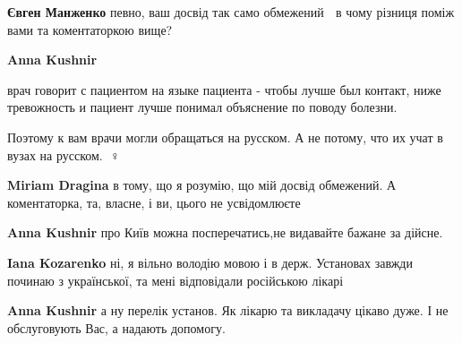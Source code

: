\begin{itemize}
\begin{itemize}
\textbf{Євген Манженко} певно, ваш досвід так само обмежений 🤭 в чому різниця поміж вами та коментаторкою вище?

 
\textbf{Anna Kushnir} 

врач говорит с пациентом на языке пациента - чтобы лучше был контакт, ниже
тревожность и пациент лучше понимал объяснение по поводу болезни.

Поэтому к вам врачи могли обращаться на русском. А не потому, что их учат в
вузах на русском. 🤦♀️


 
\textbf{Miriam Dragina} в тому, що я розумію, що мій досвід обмежений. А коментаторка, та, власне, і ви, цього не усвідомлюєте

 
\textbf{Anna Kushnir} про Київ можна посперечатись,не видавайте бажане за дійсне.

 
\textbf{Iana Kozarenko} ні, я вільно володію мовою і в держ. Установах завжди починаю з української, та мені відповідали російською лікарі

 
\textbf{Anna Kushnir} а ну перелік установ. Як лікарю та викладачу цікаво дуже. І не обслуговують Вас, а надають допомогу.


\end{itemize}
\end{itemize}
